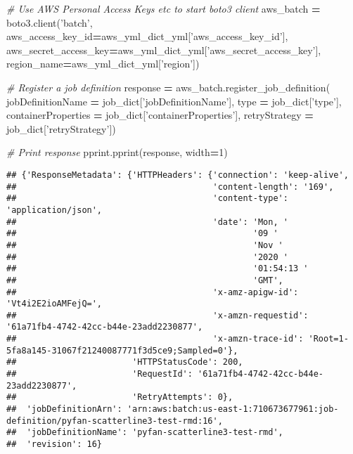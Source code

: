 \documentclass[
]{book}
\newenvironment{Shaded}{\begin{snugshade}}{\end{snugshade}}
\newcommand{\BuiltInTok}[1]{#1}
\newcommand{\CommentTok}[1]{\textcolor[rgb]{0.56,0.35,0.01}{\textit{#1}}}
\newcommand{\DecValTok}[1]{\textcolor[rgb]{0.00,0.00,0.81}{#1}}
\newcommand{\NormalTok}[1]{#1}
\newcommand{\OperatorTok}[1]{\textcolor[rgb]{0.81,0.36,0.00}{\textbf{#1}}}
\newcommand{\StringTok}[1]{\textcolor[rgb]{0.31,0.60,0.02}{#1}}
\begin{document}
\begin{Shaded}
\begin{Highlighting}[]
\CommentTok{# Use AWS Personal Access Keys etc to start boto3 client}
\NormalTok{aws_batch }\OperatorTok{=}\NormalTok{ boto3.client(}\StringTok{'batch'}\NormalTok{,}
\NormalTok{  aws_access_key_id}\OperatorTok{=}\NormalTok{aws_yml_dict_yml[}\StringTok{'aws_access_key_id'}\NormalTok{],}
\NormalTok{  aws_secret_access_key}\OperatorTok{=}\NormalTok{aws_yml_dict_yml[}\StringTok{'aws_secret_access_key'}\NormalTok{],}
\NormalTok{  region_name}\OperatorTok{=}\NormalTok{aws_yml_dict_yml[}\StringTok{'region'}\NormalTok{])}

\CommentTok{# Register a job definition}
\NormalTok{response }\OperatorTok{=}\NormalTok{ aws_batch.register_job_definition(}
\NormalTok{        jobDefinitionName }\OperatorTok{=}\NormalTok{ job_dict[}\StringTok{'jobDefinitionName'}\NormalTok{],}
        \BuiltInTok{type} \OperatorTok{=}\NormalTok{ job_dict[}\StringTok{'type'}\NormalTok{],}
\NormalTok{        containerProperties }\OperatorTok{=}\NormalTok{ job_dict[}\StringTok{'containerProperties'}\NormalTok{],}
\NormalTok{        retryStrategy }\OperatorTok{=}\NormalTok{ job_dict[}\StringTok{'retryStrategy'}\NormalTok{])}

\CommentTok{# Print response}
\NormalTok{pprint.pprint(response, width}\OperatorTok{=}\DecValTok{1}\NormalTok{)}
\end{Highlighting}
\end{Shaded}

\begin{verbatim}
## {'ResponseMetadata': {'HTTPHeaders': {'connection': 'keep-alive',
##                                       'content-length': '169',
##                                       'content-type': 'application/json',
##                                       'date': 'Mon, '
##                                               '09 '
##                                               'Nov '
##                                               '2020 '
##                                               '01:54:13 '
##                                               'GMT',
##                                       'x-amz-apigw-id': 'Vt4i2E2ioAMFejQ=',
##                                       'x-amzn-requestid': '61a71fb4-4742-42cc-b44e-23add2230877',
##                                       'x-amzn-trace-id': 'Root=1-5fa8a145-31067f21240087771f3d5ce9;Sampled=0'},
##                       'HTTPStatusCode': 200,
##                       'RequestId': '61a71fb4-4742-42cc-b44e-23add2230877',
##                       'RetryAttempts': 0},
##  'jobDefinitionArn': 'arn:aws:batch:us-east-1:710673677961:job-definition/pyfan-scatterline3-test-rmd:16',
##  'jobDefinitionName': 'pyfan-scatterline3-test-rmd',
##  'revision': 16}
\end{verbatim}
\end{document}
